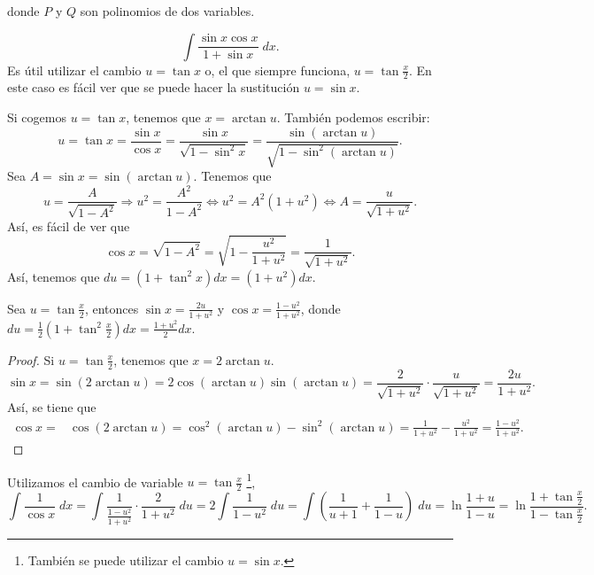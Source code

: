 donde $\displaystyle P $ y $\displaystyle Q $ son polinomios de dos variables. 
\begin{eg}
\normalfont 
\[\int \frac{\sin x \cos x}{1 + \sin x} \; dx .\]
Es útil utilizar el cambio $\displaystyle u = \tan x $ o, el que siempre funciona, $\displaystyle u = \tan\frac{x}{2} $. En este caso es fácil ver que se puede hacer la sustitución $\displaystyle u = \sin x $. 
\end{eg}
Si cogemos $\displaystyle u = \tan x $, tenemos que $\displaystyle x = \arctan u $. También podemos escribir:
\[u = \tan x = \frac{\sin x}{\cos x}= \frac{\sin x}{\sqrt{1 - \sin ^{2}x}} = \frac{\sin\left(\arctan u\right)}{\sqrt{1 - \sin ^{2}\left(\arctan u\right)}} .\]
Sea $\displaystyle A = \sin x = \sin\left(\arctan u\right) $. Tenemos que
\[u = \frac{A}{\sqrt{1-A^{2}}} \Rightarrow u^{2} = \frac{A^{2}}{1 - A^{2}} \iff u^{2}=A^{2}\left(1+u^{2}\right) \iff A = \frac{u}{\sqrt{1 + u^{2}}}.\]
Así, es fácil de ver que 
\[\cos x = \sqrt{1 - A^{2}} = \sqrt{1 - \frac{u^{2}}{1 + u^{2}}} = \frac{1}{\sqrt{1 + u^{2}}} .\]
Así, tenemos que $\displaystyle du = \left(1+\tan^{2}x\right)dx=\left(1+u^{2}\right)dx $.
\begin{fprop}[]
\normalfont Sea $\displaystyle u = \tan \frac{x}{2} $, entonces $\displaystyle \sin x = \frac{2u}{1 + u^{2}} $ y $\displaystyle \cos x = \frac{1-u^{2}}{1 + u^{2}} $, donde $\displaystyle du = \frac{1}{2}\left(1+\tan^{2}\frac{x}{2}\right)dx = \frac{1+u^{2}}{2}dx $.
\end{fprop}
\begin{proof}
Si $\displaystyle u = \tan \frac{x}{2} $, tenemos que $\displaystyle x = 2 \arctan u $. 
\[\sin x = \sin\left(2\arctan u\right) = 2 \cos\left(\arctan u\right)\sin\left(\arctan u\right) =  \frac{2}{\sqrt{1+u^{2}}} \cdot \frac{u}{\sqrt{1 + u^{2}}} = \frac{2u}{1 + u^{2}}.\]
Así, se tiene que
\[
\begin{split}
	\cos x = & \cos \left(2\arctan u\right) = \cos ^{2}\left(\arctan u\right) - \sin ^{2}\left(\arctan u\right) = \frac{1}{1 + u^{2}}-\frac{u^{2}}{1 + u^{2}} = \frac{1-u^{2}}{1 + u^{2}} .
\end{split}
\]
\end{proof}
\begin{eg}
\normalfont Utilizamos el cambio de variable $\displaystyle u = \tan\frac{x}{2} $ \footnote{También se puede utilizar el cambio $\displaystyle u = \sin x $.},
\[\int \frac{1}{\cos x} \; dx = \int \frac{1}{\frac{1-u^{2}}{1 +u^{2}}} \cdot \frac{2}{1+u^{2}} \; du = 2\int \frac{1}{1-u^{2}} \; du = \int \left(\frac{1}{u+1}+\frac{1}{1-u}\right) \; du = \ln \frac{1+u}{1-u} = \ln \frac{1 + \tan\frac{x}{2}}{1 - \tan \frac{x}{2}}.\]
\end{eg}
